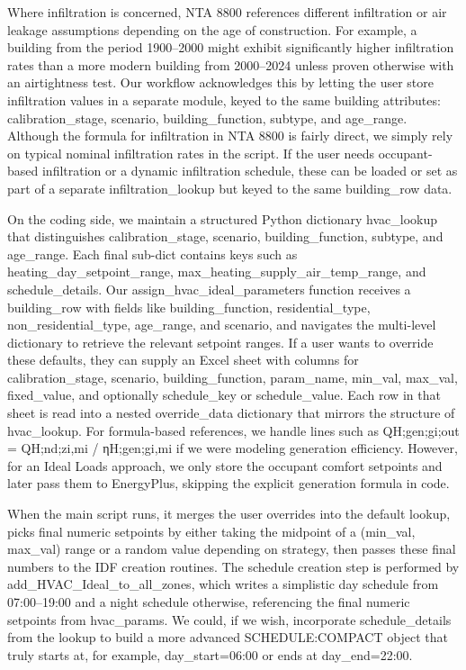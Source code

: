 Where infiltration is concerned, NTA 8800 references different infiltration or air leakage assumptions depending on the age of construction. For example, a building from the period 1900–2000 might exhibit significantly higher infiltration rates than a more modern building from 2000–2024 unless proven otherwise with an airtightness test. Our workflow acknowledges this by letting the user store infiltration values in a separate module, keyed to the same building attributes: calibration_stage, scenario, building_function, subtype, and age_range. Although the formula for infiltration in NTA 8800 is fairly direct, we simply rely on typical nominal infiltration rates in the script. If the user needs occupant-based infiltration or a dynamic infiltration schedule, these can be loaded or set as part of a separate infiltration_lookup but keyed to the same building_row data.

On the coding side, we maintain a structured Python dictionary hvac_lookup that distinguishes calibration_stage, scenario, building_function, subtype, and age_range. Each final sub-dict contains keys such as heating_day_setpoint_range, max_heating_supply_air_temp_range, and schedule_details. Our assign_hvac_ideal_parameters function receives a building_row with fields like building_function, residential_type, non_residential_type, age_range, and scenario, and navigates the multi-level dictionary to retrieve the relevant setpoint ranges. If a user wants to override these defaults, they can supply an Excel sheet with columns for calibration_stage, scenario, building_function, param_name, min_val, max_val, fixed_value, and optionally schedule_key or schedule_value. Each row in that sheet is read into a nested override_data dictionary that mirrors the structure of hvac_lookup. For formula-based references, we handle lines such as QH;gen;gi;out = QH;nd;zi,mi / ηH;gen;gi,mi if we were modeling generation efficiency. However, for an Ideal Loads approach, we only store the occupant comfort setpoints and later pass them to EnergyPlus, skipping the explicit generation formula in code.

When the main script runs, it merges the user overrides into the default lookup, picks final numeric setpoints by either taking the midpoint of a (min_val, max_val) range or a random value depending on strategy, then passes these final numbers to the IDF creation routines. The schedule creation step is performed by add_HVAC_Ideal_to_all_zones, which writes a simplistic day schedule from 07:00–19:00 and a night schedule otherwise, referencing the final numeric setpoints from hvac_params. We could, if we wish, incorporate schedule_details from the lookup to build a more advanced SCHEDULE:COMPACT object that truly starts at, for example, day_start=06:00 or ends at day_end=22:00.

